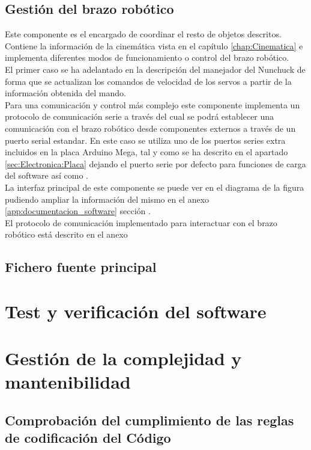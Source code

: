     \subsection{Gestión del brazo robótico} \label{subsec:SW:robotrha}
        Este componente es el encargado de coordinar el resto de objetos descritos. Contiene la información de la cinemática vista en el capítulo \ref{chap:Cinematica} e implementa diferentes modos de funcionamiento o control del brazo robótico.
        \\
        El primer caso se ha adelantado en la descripción del manejador del Nunchuck de forma que se actualizan los comandos de velocidad de los servos a partir de la información obtenida del mando.
        \\
        Para una comunicación y control más complejo este componente implementa un protocolo de comunicación serie a través del cual se podrá establecer una comunicación con el brazo robótico desde componentes externos a través de un puerto serial estandar. En este caso se utiliza uno de los puertos series extra incluidos en la placa Arduino Mega, tal y como se ha descrito en el apartado \ref{sec:Electronica:Placa} dejando el puerto serie por defecto para funciones de carga del software así como .
        \\
        La interfaz principal de este componente se puede ver en el diagrama de la figura \completar pudiendo ampliar la información del mismo en el anexo \ref{app:documentacion_software} sección \completar.
        \\
        El protocolo de comunicación implementado para interactuar con el brazo robótico está descrito en el anexo \completar
    \subsection{Fichero fuente principal} \label{subsec:SW:maincpp}

\section{Test y verificación del software} \label{sec:SW:test}

\section{Gestión de la complejidad y mantenibilidad} \label{sec:SW:gestion_complejidad}

    \subsection{Comprobación del cumplimiento de las reglas de codificación del Código}
